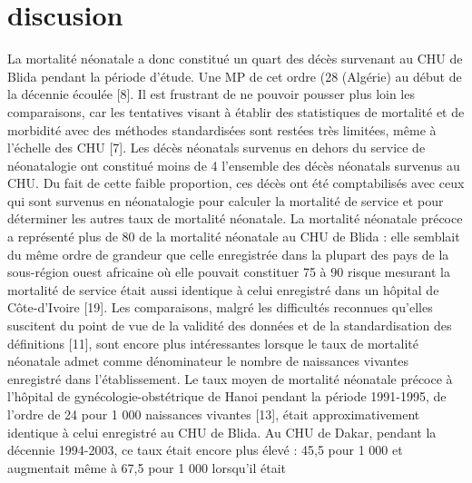 
\section{discusion}
La mortalité néonatale a donc constitué un quart des décès
survenant au CHU de Blida pendant la période d’étude. Une
MP de cet ordre (28 %
(Algérie) au début de la décennie écoulée [8]. Il est frustrant
de ne pouvoir pousser plus loin les comparaisons, car les
tentatives visant à établir des statistiques de mortalité et de
morbidité avec des méthodes standardisées sont restées très
limitées, même à l’échelle des CHU [7].
Les décès néonatals survenus en dehors du service de
néonatalogie ont constitué moins de 4 %
l’ensemble des décès néonatals survenus au CHU. Du fait
de cette faible proportion, ces décès ont été comptabilisés
avec ceux qui sont survenus en néonatalogie pour calculer
la mortalité de service et pour déterminer les autres taux de
mortalité néonatale.
La mortalité néonatale précoce a représenté plus de 80 %
de la mortalité néonatale au CHU de Blida : elle semblait du
même ordre de grandeur que celle enregistrée dans la plupart
des pays de la sous-région ouest africaine où elle pouvait
constituer 75 à 90 %
risque mesurant la mortalité de service était aussi identique à
celui enregistré dans un hôpital de Côte-d’Ivoire [19].
Les comparaisons, malgré les difficultés reconnues
qu’elles suscitent du point de vue de la validité des données
et de la standardisation des définitions [11], sont encore plus
intéressantes lorsque le taux de mortalité néonatale admet
comme dénominateur le nombre de naissances vivantes
enregistré dans l’établissement.
Le taux moyen de mortalité néonatale précoce à l’hôpital
de gynécologie-obstétrique de Hanoi pendant la période
1991-1995, de l’ordre de 24 pour 1 000 naissances vivantes
[13], était approximativement identique à celui enregistré au
CHU de Blida. Au CHU de Dakar, pendant la décennie
1994-2003, ce taux était encore plus élevé : 45,5 pour
1 000 et augmentait même à 67,5 pour 1 000 lorsqu’il était

